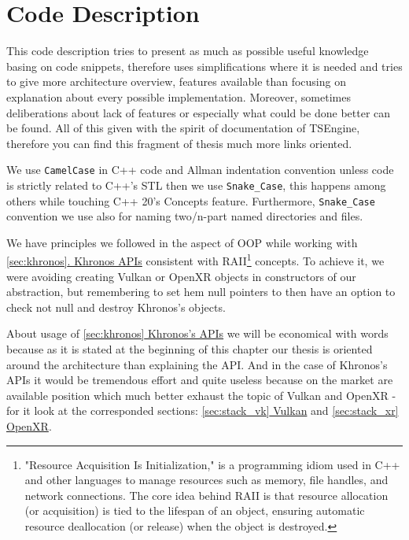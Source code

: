 \newpage
\section{Code Description}
\label{sec:code_descr}
This code description tries to present as much as possible useful knowledge basing on code snippets, therefore uses simplifications where it is needed and tries to give more architecture overview, features available than focusing on explanation about every possible implementation. Moreover, sometimes deliberations about lack of features or especially what could be done better can be found. All of this given with the spirit of documentation of TSEngine, therefore you can find this fragment of thesis much more links oriented.

We use \texttt{CamelCase} in C++ code and Allman indentation convention unless code is strictly related to C++'s STL then we use \texttt{Snake\_Case}, this happens among others while touching C++ 20's Concepts feature.
Furthermore, \texttt{Snake\_Case} convention we use also for naming two/n-part named directories and files.

We have principles we followed in the aspect of OOP while working with \hyperref[sec:khronos]{\ref*{sec:khronos}. Khronos APIs} consistent with RAII\footnote{"Resource Acquisition Is Initialization," is a programming idiom used in C++ and other languages to manage resources such as memory, file handles, and network connections. The core idea behind RAII is that resource allocation (or acquisition) is tied to the lifespan of an object, ensuring automatic resource deallocation (or release) when the object is destroyed.} concepts. To achieve it, we were avoiding creating Vulkan or OpenXR objects in constructors of our abstraction, but remembering to set hem null pointers to then have an option to check not null and destroy Khronos's objects.

About usage of \hyperref[sec:khronos]{\ref*{sec:khronos} Khronos's APIs} we will be economical with words because as it is stated at the beginning of this chapter our thesis is oriented around the architecture than explaining the API. And in the case of Khronos's APIs it would be tremendous effort and quite useless because on the market are available position which much better exhaust the topic of Vulkan and OpenXR - for it look at the corresponded sections: \hyperref[sec:stack_vk]{\ref*{sec:stack_vk} Vulkan} and \hyperref[sec:stack_xr]{\ref*{sec:stack_xr} OpenXR}.

